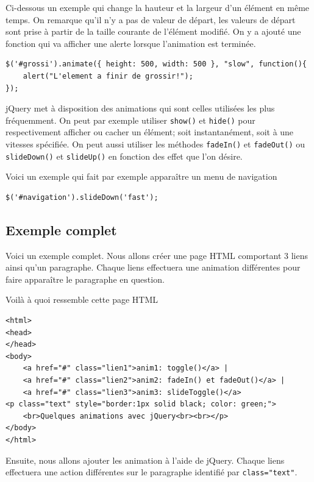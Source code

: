 \documentclass[10pt,a4paper,titlepage]{article}
\begin{document}
Ci-dessous un exemple qui change la hauteur et la largeur d'un élément en même temps. On remarque qu'il n'y a pas de valeur de départ, les valeurs de départ sont prise à partir de la taille courante de l'élément modifié. On y a ajouté une fonction qui va afficher une alerte lorsque l'animation est terminée.

\begin{lstlisting}
$('#grossi').animate({ height: 500, width: 500 }, "slow", function(){
    alert("L'element a finir de grossir!");
});
\end{lstlisting}

jQuery met à disposition des animations qui sont celles utilisées les plus fréquemment. On peut par exemple utiliser \texttt{show()} et \texttt{hide()} pour respectivement afficher ou cacher un élément; soit instantanément, soit à une vitesses spécifiée. On peut aussi utiliser les méthodes \texttt{fadeIn()} et \texttt{fadeOut()} ou \texttt{slideDown()} et \texttt{slideUp()} en fonction des effet que l'on désire. 


Voici un exemple qui fait par exemple apparaître un menu de navigation

\begin{lstlisting}
$('#navigation').slideDown('fast');
\end{lstlisting}

\subsection{Exemple complet}

Voici un exemple complet. Nous allons créer une page HTML comportant 3 liens ainsi qu'un paragraphe. Chaque liens effectuera une animation différentes pour faire apparaître le paragraphe en question.

Voilà à quoi ressemble cette page HTML

\begin{lstlisting}
<html>
<head>
</head>
<body>
	<a href="#" class="lien1">anim1: toggle()</a> | 
	<a href="#" class="lien2">anim2: fadeIn() et fadeOut()</a> | 
	<a href="#" class="lien3">anim3: slideToggle()</a>
<p class="text" style="border:1px solid black; color: green;">
	<br>Quelques animations avec jQuery<br><br></p>
</body>
</html>
\end{lstlisting}

Ensuite, nous allons ajouter les animation à l'aide de jQuery. Chaque liens effectuera une action différentes sur le paragraphe identifié par \texttt{class="text"}.
\end{document}
